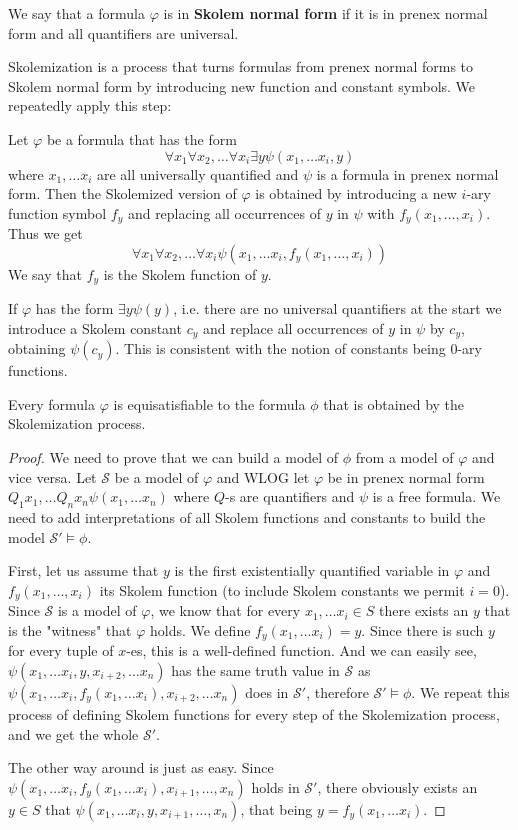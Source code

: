 \begin{defn}
	We say that a formula $\varphi$ is in \textbf{Skolem normal form} if it is in prenex normal form and all quantifiers are universal.
\end{defn}

Skolemization is a process that turns formulas from prenex normal forms to Skolem normal form by introducing new function and constant symbols. We repeatedly apply this step:

Let $\varphi$ be a formula that has the form $$\forall x_1\forall x_2,\dots \forall x_{i}\exists y\psi(x_1,\dots x_i,y)$$ where $x_1,\dots x_i$ are all universally quantified and $\psi$ is a formula in prenex normal form. Then the Skolemized version of $\varphi$ is obtained by introducing a new $i$-ary function symbol $f_y$ and replacing all occurrences of $y$ in $\psi$ with $f_y(x_1,\dots,x_i)$. Thus we get $$\forall x_1\forall x_2,\dots \forall x_{i}\psi(x_1,\dots x_i,f_y(x_1,\dots,x_i))$$ We say that $f_y$ is the Skolem function of $y$.

If $\varphi$ has the form $\exists y \psi(y)$, i.e. there are no universal quantifiers at the start we introduce a Skolem constant $c_y$ and replace all occurrences of $y$ in $\psi$ by $c_y$, obtaining $\psi(c_y)$. This is consistent with the notion of constants being $0$-ary functions.

\begin{thm}
	Every formula $\varphi$ is equisatisfiable to the formula $\phi$ that is obtained by the Skolemization process.
\end{thm}
\begin{proof}
	We need to prove that we can build a model of $\phi$ from a model of $\varphi$ and vice versa. Let $\mathcal{S}$ be a model of $\varphi$ and WLOG let $\varphi$ be in prenex normal form $Q_1x_1,\dots Q_nx_n\psi(x_1,\dots x_n)$ where $Q$-s are quantifiers and $\psi$ is a free formula. We need to add interpretations of all Skolem functions and constants to build the model $\mathcal{S}'\models\phi$. 
	
First, let us assume that $y$ is the first existentially quantified variable in $\varphi$ and $f_y(x_1,\dots,x_i)$ its Skolem function (to include Skolem constants we permit $i=0$). Since $\mathcal{S}$ is a model of $\varphi$, we know that for every $x_1,\dots x_i\in S$ there exists an $y$ that is the "witness" that $\varphi$ holds. We define $f_y(x_1,\dots x_i)=y$. Since there is such $y$ for every tuple of $x$-es, this is a well-defined function. And we can easily see, $\psi(x_1,\dots x_i,y,x_{i+2},\dots x_n)$ has the same truth value in $\mathcal{S}$ as $\psi(x_1,\dots x_i,f_y(x_1,\dots x_i),x_{i+2},\dots x_n)$ does in $\mathcal{S}'$, therefore $\mathcal{S}'\models\phi$. We repeat this process of defining Skolem functions for every step of the Skolemization process, and we get the whole $\mathcal{S}'$.

The other way around is just as easy. Since $\psi(x_1,\dots x_i,f_y(x_1,\dots x_i), x_{i+1},\dots,x_n)$ holds in $\mathcal{S}'$, there obviously exists an $y\in S$ that $\psi(x_1,\dots x_i,y, x_{i+1},\dots,x_n)$, that being $y=f_y(x_1,\dots x_i)$.
\end{proof}

